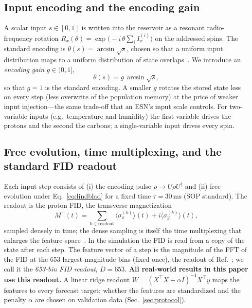 \documentclass[aps,prresearch,preprint,superscriptaddress,amsmath,amssymb,floatfix]{revtex4-2}
\newcommand{\SI}[2]{\ensuremath{#1\,\mathrm{#2}}}
\begin{document}
\subsection{Input encoding and the encoding gain}\label{sec:encoding}
A scalar input $s\in[0,1]$ is written into the reservoir as a resonant
radio-frequency rotation $R_x(\theta)=\exp\!\big(-i\,\theta\textstyle\sum_{i} I_x^{(i)}\big)$
on the addressed spins. The standard encoding is $\theta(s)=\arcsin\sqrt{s}$, chosen so
that a uniform input distribution maps to a uniform distribution of state
overlaps~\cite{Hou2026}. We introduce an \emph{encoding gain} $g\in(0,1]$,
\begin{equation}
  \theta(s) = g\,\arcsin\sqrt{s},
  \label{eq:gain}
\end{equation}
so that $g=1$ is the standard encoding. A smaller $g$ rotates the stored state less
on every step (less overwrite of the population memory) at the price of weaker input
injection---the same trade-off that an ESN's input scale controls. For two-variable
inputs (e.g.\ temperature and humidity) the first variable drives the protons and the
second the carbons; a single-variable input drives every spin.

\subsection{Free evolution, time multiplexing, and the standard FID readout}\label{sec:readout}
Each input step consists of (i) the encoding pulse $\rho\!\to\!U\rho U^\dagger$ and
(ii) free evolution under Eq.~\eqref{eq:lindblad} for a fixed time
$\tau=\SI{30}{ms}$ (SOP standard). The readout is the proton FID, the transverse
magnetization
\begin{equation}
  M^{+}(t)=\sum_{k\in\mathrm{readout}} \big\langle\sigma_x^{(k)}\big\rangle(t)
            + i\big\langle\sigma_y^{(k)}\big\rangle(t),
  \label{eq:fid}
\end{equation}
sampled densely in time; the dense sampling is itself the time multiplexing that
enlarges the feature space~\cite{Nakajima2019}. In the simulation the FID is read
from a copy of the state after each step. The feature vector of a step is the
magnitude of the FFT of the FID at the 653 largest-magnitude bins (fixed once), the
readout of Ref.~\cite{Hou2026}; we call it the \emph{653-bin FID readout}, $D=653$.
\textbf{All real-world results in this paper use this readout.} A linear ridge
readout $W=(X^\top X+\alpha I)^{-1}X^\top y$ maps the features to every forecast
target; whether the features are standardized and the penalty $\alpha$ are chosen on
validation data (Sec.~\ref{sec:protocol}).
\end{document}
